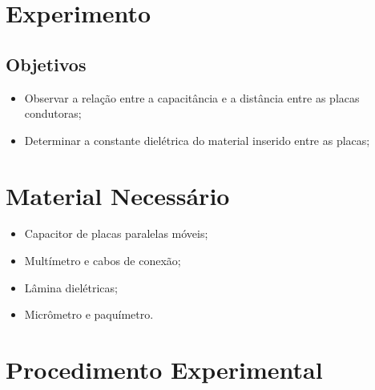 \section{Experimento}

\subsection{Objetivos}

\begin{itemize}
	\item Observar a relação entre a capacitância e a distância entre as placas condutoras;
	\item Determinar a constante dielétrica do material inserido entre as placas;
\end{itemize}

\section{Material Necessário}

\begin{itemize}
	\item Capacitor de placas paralelas móveis;
	\item Multímetro e cabos de conexão;
	\item Lâmina dielétricas;
	\item Micrômetro e paquímetro.
\end{itemize}

\section{Procedimento Experimental}

